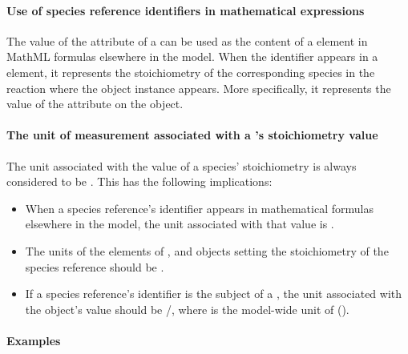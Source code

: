\paragraph{Use of species reference identifiers in mathematical expressions}
\label{sec:reaction:speciesReferences-in-mathematical-expressions}

The value of the  attribute of a \SpeciesReference can
be used as the content of a  element in MathML formulas
elsewhere in the model.  When the identifier appears in a 
element, it represents the stoichiometry of the corresponding
species in the reaction where the \SpeciesReference object
instance appears.  More specifically, it represents the value of
the  attribute on the \SpeciesReference
object.


\paragraph{The unit of measurement associated with a
  's stoichiometry value}
\label{sec:speciesreferences-units}

The unit associated with the value of a species' stoichiometry is
always considered to be .  This has the
following implications:
\begin{itemize}

\item When a species reference's identifier appears in
  mathematical formulas elsewhere in the model, the unit
  associated with that value is .

\item The units of the  elements of \AssignmentRule,
  \InitialAssignment and \EventAssignment objects setting the
  stoichiometry of the species reference should be
  .

\item If a species reference's identifier is the subject of a
  \RateRule, the unit associated with the \RateRule object's value
  should be /, where
   is the model-wide unit of 
  ().

\end{itemize}


\paragraph{Examples}

